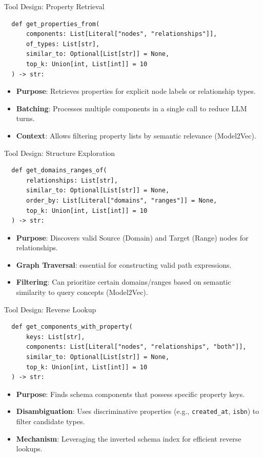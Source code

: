 \documentclass[aspectratio=169]{beamer}
\begin{document}
\begin{frame}[fragile]{Tool Design: Property Retrieval}
  \begin{verbatim}
  def get_properties_from(
      components: List[Literal["nodes", "relationships"]],
      of_types: List[str],
      similar_to: Optional[List[str]] = None,
      top_k: Union[int, List[int]] = 10
  ) -> str:
  \end{verbatim}
\vspace{0.5em}
\begin{itemize}
    \item \textbf{Purpose}: Retrieves properties for explicit node labels or relationship types.
    \item \textbf{Batching}: Processes multiple components in a single call to reduce LLM turns.
    \item \textbf{Context}: Allows filtering property lists by semantic relevance (Model2Vec).
\end{itemize}
\end{frame}

\begin{frame}[fragile]{Tool Design: Structure Exploration}
  \begin{verbatim}
  def get_domains_ranges_of(
      relationships: List[str],
      similar_to: Optional[List[str]] = None,
      order_by: List[Literal["domains", "ranges"]] = None,
      top_k: Union[int, List[int]] = 10
  ) -> str:
  \end{verbatim}
\vspace{0.5em}
\begin{itemize}
    \item \textbf{Purpose}: Discovers valid Source (Domain) and Target (Range) nodes for relationships.
    \item \textbf{Graph Traversal}: essential for constructing valid path expressions.
    \item \textbf{Filtering}: Can prioritize certain domains/ranges based on semantic similarity to query concepts (Model2Vec).
\end{itemize}
\end{frame}

\begin{frame}[fragile]{Tool Design: Reverse Lookup}
  \begin{verbatim}
  def get_components_with_property(
      keys: List[str],
      components: List[Literal["nodes", "relationships", "both"]],
      similar_to: Optional[List[str]] = None,
      top_k: Union[int, List[int]] = 10
  ) -> str:
  \end{verbatim}
\vspace{0.5em}
\begin{itemize}
    \item \textbf{Purpose}: Finds schema components that possess specific property keys.
    \item \textbf{Disambiguation}: Uses discriminative properties (e.g., \texttt{created\_at}, \texttt{isbn}) to filter candidate types.
    \item \textbf{Mechanism}: Leveraging the inverted schema index for efficient reverse lookups.
\end{itemize}
\end{frame}
\end{document}
